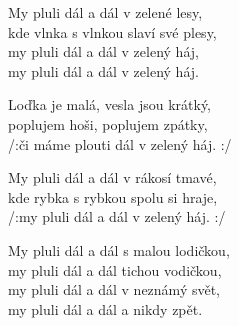 \ve
My pluli dál a dál v zelené lesy, \\
kde vlnka s vlnkou slaví své plesy, \\
 my pluli dál a dál v zelený háj,  \\
 my pluli dál a dál v zelený háj. 

\ve
Loďka je malá, vesla jsou krátký, \\
 poplujem hoši, poplujem zpátky, \\
 /:či máme plouti dál v zelený háj. :/ 

\ve
 My pluli dál a dál v rákosí tmavé, \\
 kde rybka s rybkou spolu si hraje, \\
 /:my pluli dál a dál v zelený háj. :/ 

\ve
My pluli dál a dál s malou lodičkou, \\
 my pluli dál a dál tichou vodičkou, \\
 my pluli dál a dál v neznámý svět, \\
 my pluli dál a dál a nikdy zpět.

\esong{}